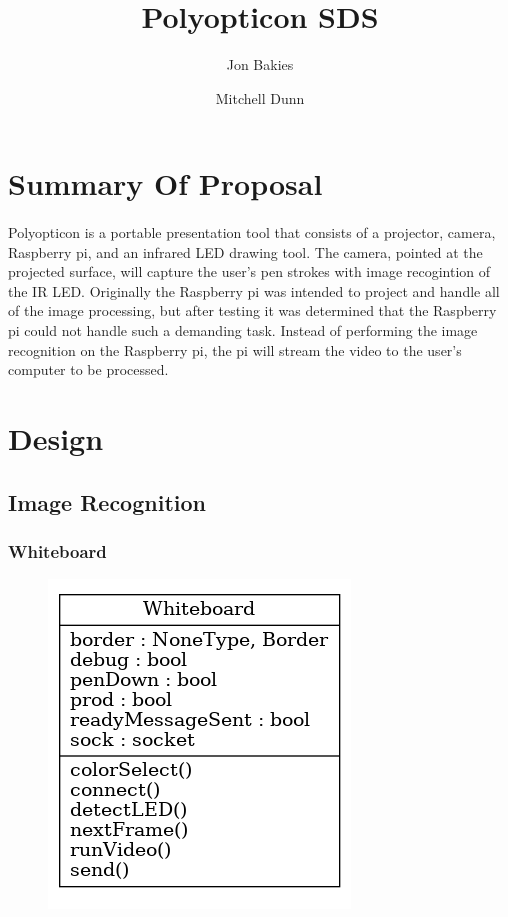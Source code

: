 \documentclass[12pt]{article}
\begin{document}
\title{Polyopticon SDS}
\author{Jon Bakies \and Mitchell Dunn} 

\maketitle
\newpage

\tableofcontents
\newpage

\section{Summary Of Proposal}
\paragraph{}
Polyopticon is a portable presentation tool that consists of a projector, camera, Raspberry pi, and an infrared LED drawing tool.
The camera, pointed at the projected surface, will capture the user's pen strokes with image recogintion of the IR LED.
Originally the Raspberry pi was intended to project and handle all of the image processing, but after testing it was determined that the Raspberry pi could not handle such a demanding task.
Instead of performing the image recognition on the Raspberry pi, the pi will stream the video to the user's computer to be processed.

\section{Design}
\subsection{Image Recognition}
\subsubsection{Whiteboard}
\begin{figure}[ht!]
\centering
\includegraphics{whiteboard.png}
\end{figure}
\end{document}
